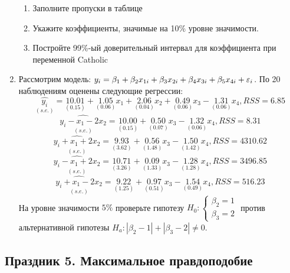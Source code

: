 \documentclass[12pt, a4paper]{article}\usepackage[]{graphicx}\usepackage[]{color}
\begin{document}
\begin{enumerate}
\begin{enumerate}
\item Заполните пропуски в таблице
\item Укажите коэффициенты, значимые на 10\% уровне значимости.
\item Постройте 99\%-ый доверительный интервал для коэффициента при переменной Catholic
\end{enumerate}

\item Рассмотрим модель:
$y_i = \beta_1 + \beta_2 x_{1i} + \beta_3 x_{2i} + \beta_4 x_{3i} + \beta_5 x_{4i} + \varepsilon_i$.
По 20 наблюдениям оценены следующие регрессии:
\[
\underset{(s.e.)}{\hat{y_i}} = \underset{(0.15)}{10.01} + \underset{(0.06)}{1.05}x_1 + \underset{(0.04)}{2.06}x_2 + \underset{(0.06)}{0.49}x_3 - \underset{(0.06)}{1.31}x_4, RSS = 6.85
\]
\[
\underset{(s.e.)}{\widehat{y_i- x_1 - 2x_2}} = \underset{(0.15)}{10.00} + \underset{(0.07)}{0.50}x_3 - \underset{(0.06)}{1.32}x_4, RSS = 8.31
\]
\[
\underset{(s.e.)}{\widehat{y_i + x_1 + 2x_2}} = \underset{(3.62)}{9.93} + \underset{(1.48)}{0.56}x_3 - \underset{(1.42)}{1.50}x_4, RSS = 4310.62
\]
\[
\underset{(s.e.)}{\widehat{y_i - x_1 + 2x_2}} = \underset{(3.26)}{10.71} + \underset{(1.33)}{0.09}x_3 - \underset{(1.28)}{1.28}x_4, RSS = 3496.85
\]
\[
\underset{(s.e.)}{\widehat{y_i + x_1 - 2x_2}} = \underset{(1.25)}{9.22} + \underset{(0.51)}{0.97}x_3 - \underset{(0.49)}{1.54}x_4, RSS = 516.23
\]
На уровне значимости $5\%$ проверьте гипотезу $H_0: \begin{cases} \beta_2 = 1 \\ \beta_3 = 2 \end{cases}$ против альтернативной гипотезы $H_a: |\beta_2 - 1| + |\beta_3 - 2| \not= 0$.


\end{enumerate}



\subsection{Праздник 5. Максимальное правдоподобие}
\end{document}
